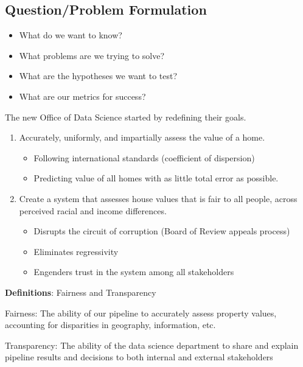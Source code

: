 \documentclass[
  letterpaper,
  DIV=11,
  numbers=noendperiod]{scrreprt}
\providecommand{\tightlist}{%
  \setlength{\itemsep}{0pt}\setlength{\parskip}{0pt}}\usepackage{longtable,booktabs,array}
\begin{document}
\hypertarget{questionproblem-formulation}{%
\subsection{Question/Problem
Formulation}\label{questionproblem-formulation}}

\begin{itemize}
\tightlist
\item
  What do we want to know?
\item
  What problems are we trying to solve?
\item
  What are the hypotheses we want to test?
\item
  What are our metrics for success?
\end{itemize}

The new Office of Data Science started by redefining their goals.

\begin{enumerate}
\def\labelenumi{\arabic{enumi}.}
\item
  Accurately, uniformly, and impartially assess the value of a home.

  \begin{itemize}
  \tightlist
  \item
    Following international standards (coefficient of dispersion)
  \item
    Predicting value of all homes with as little total error as
    possible.
  \end{itemize}
\item
  Create a system that assesses house values that is fair to all people,
  across perceived racial and income differences.

  \begin{itemize}
  \tightlist
  \item
    Disrupts the circuit of corruption (Board of Review appeals process)
  \item
    Eliminates regressivity
  \item
    Engenders trust in the system among all stakeholders
  \end{itemize}
\end{enumerate}

\begin{tcolorbox}[enhanced jigsaw, breakable, colbacktitle=quarto-callout-color!10!white, colback=white, opacitybacktitle=0.6, opacityback=0, bottomrule=.15mm, titlerule=0mm, toptitle=1mm, bottomtitle=1mm, left=2mm, colframe=quarto-callout-color-frame, title={Definitions}, rightrule=.15mm, toprule=.15mm, leftrule=.75mm, arc=.35mm, coltitle=black]

\textbf{Definitions}: Fairness and Transparency

Fairness: The ability of our pipeline to accurately assess property
values, accounting for disparities in geography, information, etc.

Transparency: The ability of the data science department to share and
explain pipeline results and decisions to both internal and external
stakeholders

\end{tcolorbox}
\end{document}
